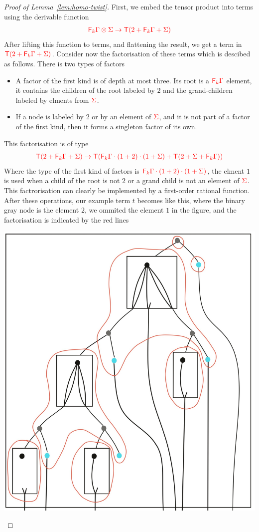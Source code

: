 \begin{proof}[Proof of Lemma~\ref{lem:homo-twist}]
First, we embed the tensor product into terms using the derivable function
\begin{align*}
{\color{red}{{\color{red}{\mathsf F_{k}}}\Gamma \otimes \Sigma \to {\color{red}{\mathsf T}}(2+{\color{red}{\mathsf F_{k}}}\Gamma +\Sigma)}}
\end{align*}
After lifting this function to terms, and flattening the result, we get a term in ${\color{red}{{\color{red}{\mathsf T}}(2+{\color{red}{\mathsf F_{k}}}\Gamma +\Sigma)}}$. 
Consider now the factorisation of these terms
 which is descibed as follows. There is two types of factors
\begin{itemize}
\item  A factor of the first kind is of depth at most three. Its root is a ${\color{red}{\mathsf F_{k}}}{\color{red}{\Gamma}}$ element, it contains the children of the root labeled by $2$ and the grand-children labeled by elments from ${\color{red}{\Sigma}}$.
\item If a node is labeled by $2$ or by an element of ${\color{red}{\Sigma}}$, and it is not part of a factor of the first kind, then it forms a singleton factor of its own.    
\end{itemize}
This factorisation is of type
\begin{align*}
{\color{red}{{\color{red}{\mathsf T}}(2+{\color{red}{\mathsf F_{k}}}\Gamma +\Sigma) \to {\color{red}{\mathsf T}}({\color{red}{\mathsf F_{k}}}\Gamma\cdot(1+2)\cdot(1+\Sigma)+{\color{red}{\mathsf T}}(2+\Sigma+{\color{red}{\mathsf F_{k}}}\Gamma))}}
\end{align*}
Where the type of the first kind of factors is ${\color{red}{{\color{red}{\mathsf F_{k}}}\Gamma\cdot(1+2)\cdot(1+\Sigma)}}$, the elment $1$ is used when a child of the root is not $2$ or a grand child is not an element of ${\color{red}{\Sigma}}$. 
This factrorisation can clearly be implemented by a first-order rational function. After these operations, our example term $t$ becomes like this, where the binary gray node is the element $2$, we ommited the element $1$ in the figure, and the factorisation is indicated by the red lines
\begin{center}
\includegraphics[scale=.09]{MyPic23.jpg}

\end{center}
\end{proof}
